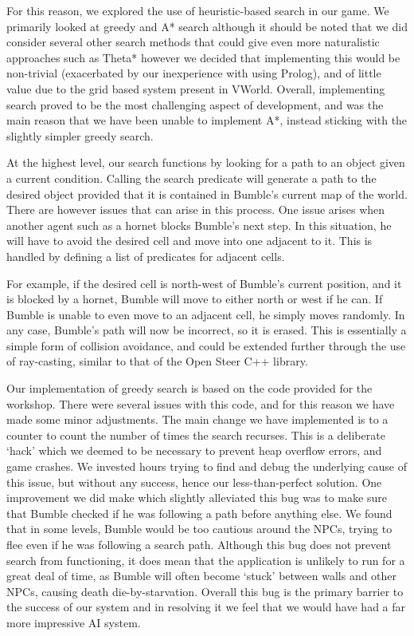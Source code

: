 \documentclass[a4paper,oneside]{report}
\begin{document}
For this reason, we explored the use of heuristic-based search in our game. We primarily looked at greedy and A* search although it should be noted that we did consider several other search methods that could give even more naturalistic approaches such as Theta* however we decided that implementing this would be non-trivial (exacerbated by our inexperience with using Prolog), and of little value due to the grid based system present in VWorld. Overall, implementing search proved to be the most challenging aspect of development, and was the main reason that we have been unable to implement A*, instead sticking with the slightly simpler greedy search.  

At the highest level, our search functions by looking for a path to an object given a current condition. Calling the search predicate will generate a path to the desired object provided that it is contained in Bumble's current map of the world.  There are however issues that can arise in this process. One issue arises when another agent such as a hornet blocks Bumble's next step. In this situation, he will have to avoid the desired cell and move into one adjacent to it. This is handled by defining a list of predicates for adjacent cells. 

For example, if the desired cell is north-west of Bumble's current position, and it is blocked by a hornet, Bumble will move to either north or west if he can. If Bumble is unable to even move to an adjacent cell, he simply moves randomly. In any case, Bumble's path will now be incorrect, so it is erased. This is essentially a simple form of collision avoidance, and could be extended further through the use of ray-casting, similar to that of the Open Steer C++ library.

Our implementation of greedy search is based on the code provided for the workshop. There were several issues with this code, and for this reason we have made some minor adjustments. The main change we have implemented is to a counter to count the number of times the search recurses. This is a deliberate `hack' which we deemed to be necessary to prevent heap overflow errors, and game crashes. We invested hours trying to find and debug the underlying cause of this issue, but without any success, hence our less-than-perfect solution. One improvement we did make which slightly alleviated this bug was to make sure that Bumble checked if he was following a path before anything else. We found that in some levels, Bumble would be too cautious around the NPCs, trying to flee even if he was following a search path.  Although this bug does not prevent search from functioning, it does mean that the application is unlikely to run for a great deal of time, as Bumble will often become `stuck' between walls and other NPCs, causing death die-by-starvation. Overall this bug is the primary barrier to the success of our system and in resolving it we feel that we would have had a far more impressive AI system. 
\end{document}
